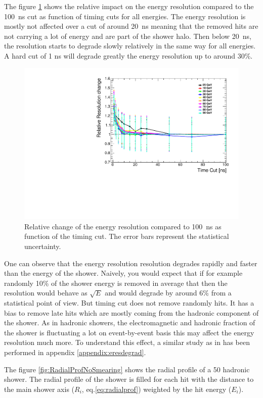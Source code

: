 The figure \ref{fig:resoRelativeNoSmearing} shows the relative impact on the energy resolution compared to the \SI{100}{\nano\second} cut as function of timing cuts for all energies. The energy resolution is mostly not affected over a cut of around \SI{20}{\nano\second} meaning that the removed hits are not carrying a lot of energy and are part of the shower halo. Then below \SI{20}{\nano\second}, the resolution starts to degrade slowly relatively in the same way for all energies. A hard cut of 1 ns will degrade greatly the energy resolution up to around 30\%.

\begin{figure}[htbp!]
  \centering
  \includegraphics[width=0.5\linewidth]{chap6/fig_TimingILD/NoSmearing/ShowerReso_TimeCuts_noSmearing}
  \caption{Relative change of the energy resolution compared to \SI{100}{\nano\second} as function of the timing cut. The error bars represent the statistical uncertainty.} \label{fig:resoRelativeNoSmearing}
\end{figure}

One can observe that the energy resolution resolution degrades rapidly and faster than the energy of the shower. Naively, you would expect that if for example randomly 10\% of the shower energy is removed in average that then the resolution would behave as $\sqrt{E}$ and would degrade by around 6\% from a statistical point of view. But timing cut does not remove randomly hits. It has a bias to remove late hits which are mostly coming from the hadronic component of the shower. As in hadronic showers, the electromagnetic and hadronic fraction of the shower is fluctuating a lot on event-by-event basis this may affect the energy resolution much more. To understand this effect, a similar study as in \cite{SoftCompNew2012} has been performed in appendix \ref{appendix:eresdegrad}.

The figure \ref{fig:RadialProfNoSmearing} shows the radial profile of a 50 \GeV hadronic shower. The radial profile of the shower is filled for each hit with the distance to the main shower axis ($R_{i}$, eq.\ref{eq:radialprof})  weighted by the hit energy ($E_{i}$).

